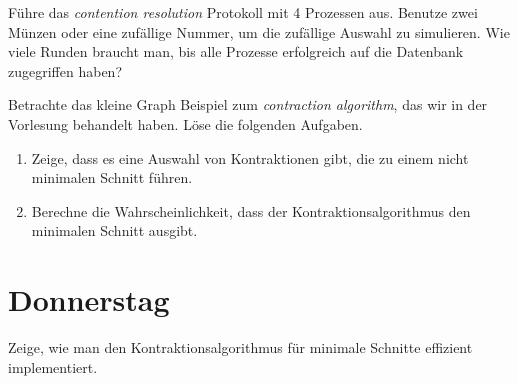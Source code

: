 \documentclass{uebung_cs}
\begin{document}
\begin{aufgabe}
	Führe das \textit{contention resolution} Protokoll mit 4 Prozessen aus. Benutze zwei Münzen oder eine zufällige Nummer, um die zufällige Auswahl zu simulieren. Wie viele Runden braucht man, bis alle Prozesse erfolgreich auf die Datenbank zugegriffen haben?
\end{aufgabe}    

\begin{aufgabe}[Minimum cut]
	Betrachte das \glqq kleine Graph\grqq{} Beispiel zum \textit{contraction algorithm}, das wir in der Vorlesung behandelt haben. Löse die folgenden Aufgaben.
	\begin{enumerate}
		\item Zeige, dass es eine Auswahl von Kontraktionen gibt, die zu einem nicht minimalen Schnitt führen.\\
		\item Berechne die Wahrscheinlichkeit, dass der Kontraktionsalgorithmus den minimalen Schnitt ausgibt.
	\end{enumerate}
\end{aufgabe}

\section*{Donnerstag}

\begin{aufgabe}
	Zeige, wie man den Kontraktionsalgorithmus für minimale Schnitte effizient implementiert.
\end{aufgabe}
\end{document}
